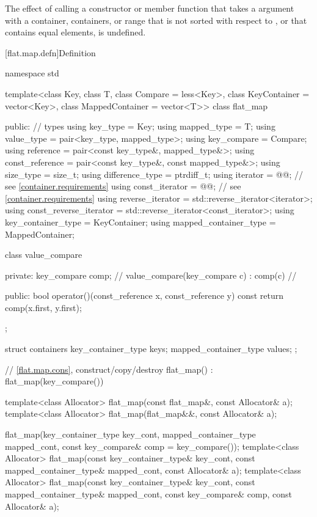 \pnum
The effect of calling a constructor or member function
that takes a  argument with
a container, containers, or range
that is not sorted with respect to , or
that contains equal elements,
is undefined.

[flat.map.defn]{Definition}

\begin{codeblock}
namespace std {
  template<class Key, class T, class Compare = less<Key>,
           class KeyContainer = vector<Key>, class MappedContainer = vector<T>>
  class flat_map {
  public:
    // types
    using key_type               = Key;
    using mapped_type            = T;
    using value_type             = pair<key_type, mapped_type>;
    using key_compare            = Compare;
    using reference              = pair<const key_type&, mapped_type&>;
    using const_reference        = pair<const key_type&, const mapped_type&>;
    using size_type              = size_t;
    using difference_type        = ptrdiff_t;
    using iterator               = @@; // see \ref{container.requirements}
    using const_iterator         = @@; // see \ref{container.requirements}
    using reverse_iterator       = std::reverse_iterator<iterator>;
    using const_reverse_iterator = std::reverse_iterator<const_iterator>;
    using key_container_type     = KeyContainer;
    using mapped_container_type  = MappedContainer;

    class value_compare {
    private:
      key_compare comp;                                 // \expos
      value_compare(key_compare c) : comp(c) { }        // \expos

    public:
      bool operator()(const_reference x, const_reference y) const {
        return comp(x.first, y.first);
      }
    };

    struct containers {
      key_container_type keys;
      mapped_container_type values;
    };

    // \ref{flat.map.cons}, construct/copy/destroy
    flat_map() : flat_map(key_compare()) { }

    template<class Allocator>
      flat_map(const flat_map&, const Allocator& a);
    template<class Allocator>
      flat_map(flat_map&&, const Allocator& a);

    flat_map(key_container_type key_cont, mapped_container_type mapped_cont,
             const key_compare& comp = key_compare());
    template<class Allocator>
      flat_map(const key_container_type& key_cont, const mapped_container_type& mapped_cont,
               const Allocator& a);
    template<class Allocator>
      flat_map(const key_container_type& key_cont, const mapped_container_type& mapped_cont,
               const key_compare& comp, const Allocator& a);

}}
\end{codeblock}
